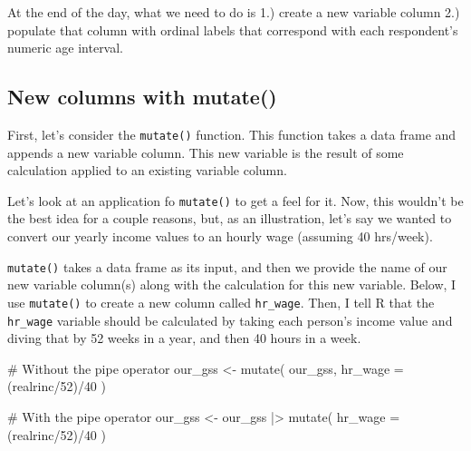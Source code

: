 \documentclass[
  letterpaper,
  DIV=11,
  numbers=noendperiod]{scrreprt}
\newenvironment{Shaded}{\begin{snugshade}}{\end{snugshade}}
\newcommand{\AttributeTok}[1]{\textcolor[rgb]{0.40,0.45,0.13}{#1}}
\newcommand{\CommentTok}[1]{\textcolor[rgb]{0.37,0.37,0.37}{#1}}
\newcommand{\DecValTok}[1]{\textcolor[rgb]{0.68,0.00,0.00}{#1}}
\newcommand{\FunctionTok}[1]{\textcolor[rgb]{0.28,0.35,0.67}{#1}}
\newcommand{\NormalTok}[1]{\textcolor[rgb]{0.00,0.23,0.31}{#1}}
\newcommand{\OtherTok}[1]{\textcolor[rgb]{0.00,0.23,0.31}{#1}}
\newcommand{\SpecialCharTok}[1]{\textcolor[rgb]{0.37,0.37,0.37}{#1}}
\begin{document}
At the end of the day, what we need to do is 1.) create a new variable
column 2.) populate that column with ordinal labels that correspond with
each respondent's numeric age interval.

\subsection{New columns with mutate()}\label{new-columns-with-mutate}

First, let's consider the \texttt{mutate()} function. This function
takes a data frame and appends a new variable column. This new variable
is the result of some calculation applied to an existing variable
column.

Let's look at an application fo \texttt{mutate()} to get a feel for it.
Now, this wouldn't be the best idea for a couple reasons, but, as an
illustration, let's say we wanted to convert our yearly income values to
an hourly wage (assuming 40 hrs/week).

\texttt{mutate()} takes a data frame as its input, and then we provide
the name of our new variable column(s) along with the calculation for
this new variable. Below, I use \texttt{mutate()} to create a new column
called \texttt{hr\_wage}. Then, I tell R that the \texttt{hr\_wage}
variable should be calculated by taking each person's income value and
diving that by 52 weeks in a year, and then 40 hours in a week.

\begin{Shaded}
\begin{Highlighting}[]
\CommentTok{\# Without the pipe operator}
\NormalTok{our\_gss }\OtherTok{\textless{}{-}} \FunctionTok{mutate}\NormalTok{(}
\NormalTok{  our\_gss,}
  \AttributeTok{hr\_wage =}\NormalTok{ (realrinc}\SpecialCharTok{/}\DecValTok{52}\NormalTok{)}\SpecialCharTok{/}\DecValTok{40}
\NormalTok{  )}
\end{Highlighting}
\end{Shaded}

\begin{Shaded}
\begin{Highlighting}[]
\CommentTok{\# With the pipe operator}
\NormalTok{our\_gss }\OtherTok{\textless{}{-}}\NormalTok{ our\_gss }\SpecialCharTok{|\textgreater{}}
  \FunctionTok{mutate}\NormalTok{(}
    \AttributeTok{hr\_wage =}\NormalTok{ (realrinc}\SpecialCharTok{/}\DecValTok{52}\NormalTok{)}\SpecialCharTok{/}\DecValTok{40}
\NormalTok{  )}
\end{Highlighting}
\end{Shaded}
\end{document}

